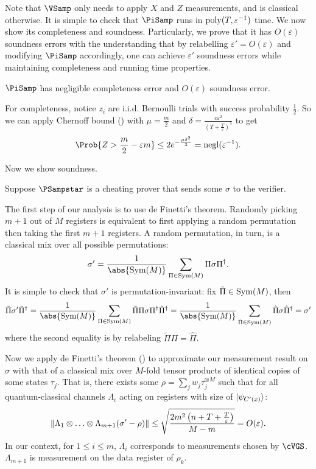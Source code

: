 Note that $\VSamp$ only needs to apply $X$ and $Z$ measurements, and is classical otherwise.
It is simple to check that $\PiSamp$ runs in $\operatorname*{\operatorname{poly}}(T, \varepsilon^{-1})$ time.
We now show its completeness and soundness.
Particularly, we prove that it has $O(\varepsilon)$ soundness errors
with the understanding that by relabelling $\varepsilon'=O(\varepsilon)$ and modifying $\PiSamp$ accordingly,
one can achieve $\varepsilon'$ soundness errors while maintaining completeness and running time properties.
  
\begin{thm}
    \label{QPIP1thm}
	$\PiSamp$ has negligible completeness error and $O(\varepsilon)$ soundness error. 
\end{thm}
\begin{prf}
	For completeness, notice $z_i$ are i.i.d. Bernoulli trials with success probability $\frac{1}{2}$.
	So we can apply Chernoff bound () with $\mu=\frac{m}{2}$ and $\delta=\frac{c\varepsilon^2}{\left(T+\frac{T}{\varepsilon}\right)^5}$ to get
	$$\Prob{Z>\frac{m}{2}-\varepsilon m}\leq2e^{-\frac{\mu\delta^2}{3}}=\negl(\varepsilon^{-1}).$$

	Now we show soundness.

	Suppose $\PSampstar$ is a cheating prover that sends some $\sigma$ to the verifier.

	The first step of our analysis is to use de Finetti's theorem.
	Randomly picking $m+1$ out of $M$ registers is equivalent to first applying a random permutation then taking the first $m+1$ registers.
	A random permutation, in turn, is a classical mix over all possible permutations:
	$$\sigma'=\frac{1}{\abs{\Sym(M)}}\sum_{\Pi\in\Sym(M)}\Pi\sigma\Pi^\dagger.$$
	It is simple to check that $\sigma'$ is permutation-invariant:
	fix $\tilde{\Pi}\in\operatorname{Sym}(M)$, then
	$$\tilde{\Pi}\sigma'\tilde{\Pi}^\dagger
	=\frac{1}{\abs{\Sym(M)}}\sum_{\Pi\in\Sym(M)}\tilde{\Pi}\Pi\sigma\Pi^\dagger\tilde{\Pi}^\dagger
	=\frac{1}{\abs{\Sym(M)}}\sum_{\hat{\Pi}\in\Sym(M)}\hat{\Pi}\sigma\hat{\Pi}^\dagger
	=\sigma'$$
	where the second equality is by relabeling $\tilde{\Pi}\Pi=\hat{\Pi}$.


	Now we apply de Finetti's theorem () to approximate our measurement result on $\sigma$ with that of a classical mix over $M$-fold tensor products of identical copies of some states $\tau_j$.
	That is, there exists some $\rho=\sum_j w_j\tau_j^{\otimes M}$
	such that for all quantum-classical channels $\Lambda_i$ acting on registers with size of $\ket{\psi_{C'(x)}}$:
	$$\left\lVert\Lambda_1\otimes\ldots\otimes\Lambda_{m+1}(\sigma'-\rho)\right\rVert
	\leq\sqrt{\frac{2m^2\left(n+T+\frac{T}{\varepsilon}\right)}{M-m}}
	=O(\varepsilon).$$
	In our context, for $1\leq i\leq m$, $\Lambda_i$ corresponds to measurements chosen by $\cVGS$.
	$\Lambda_{m+1}$ is measurement on the data register of $\rho_k$.
	

\end{prf}
